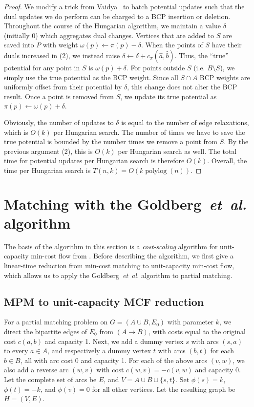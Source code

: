 \documentclass[11pt]{article}
\def\etal{\textsl{et~al.}}
\def\polylog{\mathop{\mathrm{polylog}}}
\def\fsupply{\phi}
\theoremstyle{plain}
\begin{document}
\begin{proof}
We modify a trick from Vaidya~\cite{Vaidya89} to batch potential updates such
that the dual updates we do perform can be charged to a BCP insertion or
deletion.
Throughout the course of the Hungarian algorithm, we maintain a value $\delta$
(initially 0) which aggregates dual changes.
Vertices that are added to $S$ are saved into $P$ with weight
$\omega(p) \gets \pi(p) - \delta$.
When the points of $S$ have their duals increased in (2), we instead raise
$\delta \gets \delta + c_\pi(\hat{a}, \hat{b})$.
Thus, the ``true'' potential for any point in $S$ is $\omega(p) + \delta$.
For points outside $S$ (i.e. $B \setminus S$), we simply use the true potential
as the BCP weight.
Since all $S \cap A$ BCP weights are uniformly offset from their potential by
$\delta$, this change does not alter the BCP result.
Once a point is removed from $S$, we update its true potential as
$\pi(p) \gets \omega(p) + \delta$.

Obviously, the number of updates to $\delta$ is equal to the number of edge
relaxations, which is $O(k)$ per Hungarian search.
The number of times we have to save the true potential is bounded by the number
times we remove a point from $S$.
By the previous argument (2), this is $O(k)$ per Hungarian search as well.
The total time for potential updates per Hungarian search is therefore $O(k)$.
Overall, the time per Hungarian search is $T(n, k) = O(k\polylog(n))$.
\end{proof}


\section{Matching with the Goldberg~{\etal} algorithm}
\label{section:goldberg}

The basis of the algorithm in this section is a \emph{cost-scaling} algorithm
for unit-capacity min-cost flow from \cite{GHKT17}.
Before describing the algorithm, we first give a linear-time reduction from
min-cost matching to unit-capacity min-cost flow, which allows us to apply the
Goldberg~{\etal} algorithm to partial matching.

\subsection{MPM to unit-capacity MCF reduction}
\label{subsection:mcm_mcf_reduction}

For a partial matching problem on $G = (A \cup B, E_0)$ with parameter $k$, we
direct the bipartite edges of $E_0$ from $(A \to B)$, with costs equal to the
original cost $c(a, b)$ and capacity 1.
Next, we add a dummy vertex $s$ with arcs $(s, a)$ to every $a \in A$,
and respectively a dummy vertex $t$ with arcs $(b, t)$ for each $b \in B$,
all with arc cost 0 and capacity 1.
For each of the above arcs $(v, w)$, we also add a reverse arc $(w, v)$ with
cost $c(w, v) = -c(v, w)$ and capacity 0.
Let the complete set of arcs be $E$, and $V = A \cup B \cup \{s, t\}$.
Set $\fsupply(s) = k$, $\fsupply(t) = -k$, and $\fsupply(v) = 0$ for all other
vertices.
Let the resulting graph be $H = (V, E)$.
\end{document}

